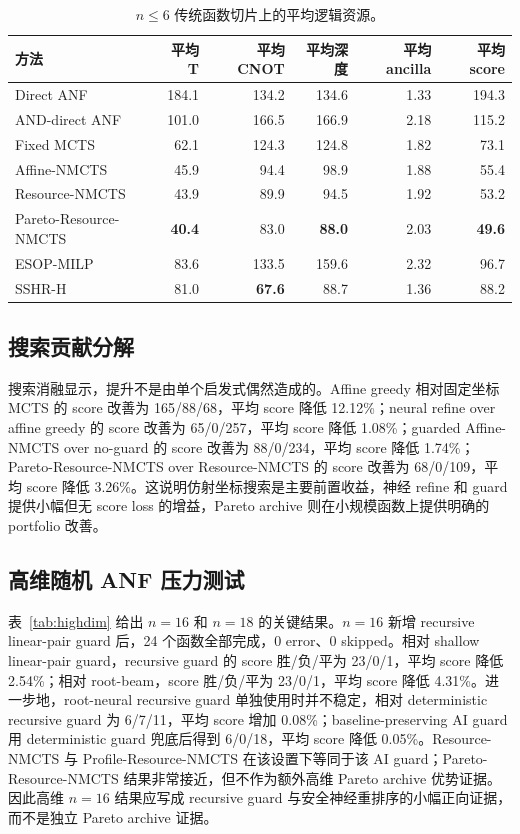 \documentclass[UTF8,fontset=macnew,11pt]{ctexart}
\newcommand{\method}{Resource-NMCTS}
\newcommand{\pareto}{Pareto-Resource-NMCTS}
\begin{document}
\begin{table}[t]
\centering
\small
\caption{$n\leq 6$ 传统函数切片上的平均逻辑资源。}
\label{tab:traditional}
\begin{tabular}{lrrrrr}
\toprule
方法 & 平均 T & 平均 CNOT & 平均深度 & 平均 ancilla & 平均 score \\
\midrule
Direct ANF & 184.1 & 134.2 & 134.6 & 1.33 & 194.3 \\
AND-direct ANF & 101.0 & 166.5 & 166.9 & 2.18 & 115.2 \\
Fixed MCTS & 62.1 & 124.3 & 124.8 & 1.82 & 73.1 \\
Affine-NMCTS & 45.9 & 94.4 & 98.9 & 1.88 & 55.4 \\
\method{} & 43.9 & 89.9 & 94.5 & 1.92 & 53.2 \\
\pareto{} & \textbf{40.4} & 83.0 & \textbf{88.0} & 2.03 & \textbf{49.6} \\
ESOP-MILP & 83.6 & 133.5 & 159.6 & 2.32 & 96.7 \\
SSHR-H & 81.0 & \textbf{67.6} & 88.7 & 1.36 & 88.2 \\
\bottomrule
\end{tabular}
\end{table}

\subsection{搜索贡献分解}

搜索消融显示，提升不是由单个启发式偶然造成的。Affine greedy 相对固定坐标 MCTS 的 score 改善为 165/88/68，平均 score 降低 12.12\%；neural refine over affine greedy 的 score 改善为 65/0/257，平均 score 降低 1.08\%；guarded Affine-NMCTS over no-guard 的 score 改善为 88/0/234，平均 score 降低 1.74\%；\pareto{} over \method{} 的 score 改善为 68/0/109，平均 score 降低 3.26\%。这说明仿射坐标搜索是主要前置收益，神经 refine 和 guard 提供小幅但无 score loss 的增益，Pareto archive 则在小规模函数上提供明确的 portfolio 改善。

\subsection{高维随机 ANF 压力测试}

表~\ref{tab:highdim} 给出 $n=16$ 和 $n=18$ 的关键结果。$n=16$ 新增 recursive linear-pair guard 后，24 个函数全部完成，0 error、0 skipped。相对 shallow linear-pair guard，recursive guard 的 score 胜/负/平为 23/0/1，平均 score 降低 2.54\%；相对 root-beam，score 胜/负/平为 23/0/1，平均 score 降低 4.31\%。进一步地，root-neural recursive guard 单独使用时并不稳定，相对 deterministic recursive guard 为 6/7/11，平均 score 增加 0.08\%；baseline-preserving AI guard 用 deterministic guard 兜底后得到 6/0/18，平均 score 降低 0.05\%。\method{} 与 Profile-\method{} 在该设置下等同于该 AI guard；\pareto{} 结果非常接近，但不作为额外高维 Pareto archive 优势证据。因此高维 $n=16$ 结果应写成 recursive guard 与安全神经重排序的小幅正向证据，而不是独立 Pareto archive 证据。
\end{document}
